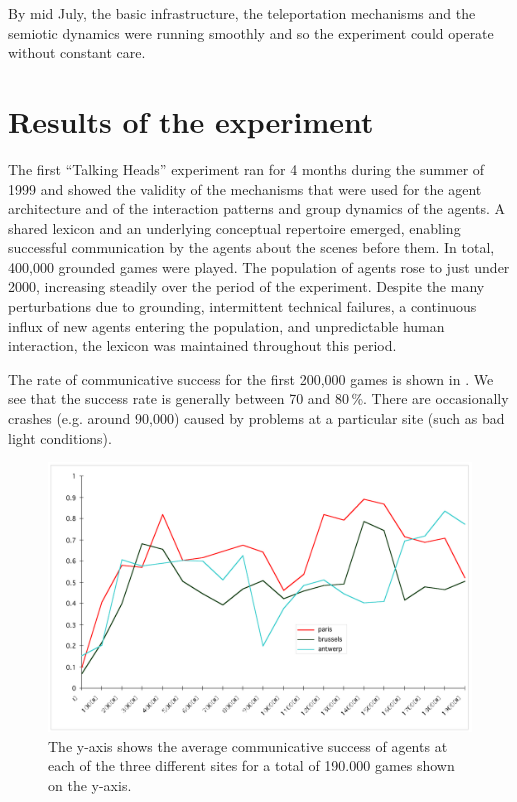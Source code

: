 By mid July, the basic infrastructure, the teleportation mechanisms and the semiotic dynamics were running 
smoothly and so the experiment could operate without constant care. 

\section{Results of the experiment}

The first ``Talking Heads'' experiment ran for 4 months during the summer of 1999 and showed the validity of the mechanisms that were used for the agent architecture and of the interaction patterns and group dynamics of the agents. A shared lexicon and an underlying conceptual repertoire emerged, enabling successful communication by the agents about the scenes before them. In total, 400,000 grounded games were played. The population of agents rose to just under 2000, increasing steadily over the period of the experiment. Despite the many perturbations due to grounding, intermittent technical failures, a continuous influx of new agents entering the population, and unpredictable human interaction, the lexicon was maintained throughout this period.

The rate of communicative success for the first 200,000 games is shown in . We see that the success rate is generally between 70 and 80\,\%. There are occasionally crashes (e.g. around 90,000) caused by problems at a particular site (such as bad light conditions). 


\begin{figure}[htbp]
  \centerline{\includegraphics[width=\textwidth]{chap8/figures/allsites.pdf}}
\caption{\label{fig:allsites}The y-axis shows the average communicative success of agents at each of the three different sites for a total 
of 190.000 games shown on the y-axis. 
}
\end{figure}

